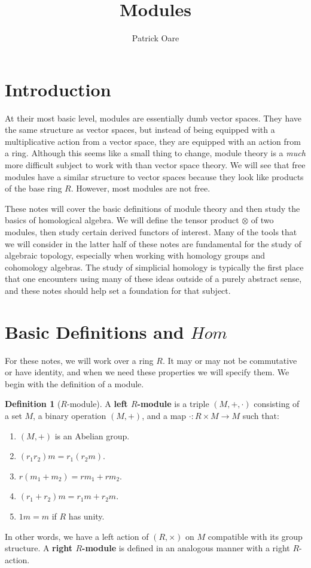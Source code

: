 \documentclass[11pt, oneside]{amsart}   	%
\title{Modules}
\author{Patrick Oare}
\theoremstyle{definition}
\newtheorem{definition}{Definition}[section]
\begin{document}
\maketitle

\section{Introduction}

At their most basic level, modules are essentially dumb vector spaces. They have the same structure as vector spaces, but 
instead of being equipped with a multiplicative action from a vector space, they are equipped with an action from a ring. 
Although this seems like a small thing to change, module theory is a \textit{much} more difficult subject to work with than vector 
space theory. We will see that free modules have a similar structure to vector spaces because they look like products of the 
base ring $R$. However, most modules are not free. 

These notes will cover the basic definitions of module theory and then study the basics of homological algebra. We will define 
the tensor product $\otimes$ of two modules, then study certain derived functors of interest. Many of the tools that we will 
consider in the latter half of these notes are fundamental for the study of algebraic topology, especially when working with 
homology groups and cohomology algebras. The study of simplicial homology is typically the first place that one encounters 
using many of these ideas outside of a purely abstract sense, and these notes should help set a foundation for that subject. 

\section{Basic Definitions and $Hom$}

For these notes, we will work over a ring $R$. It may or may not be commutative or have identity, and when we need these 
properties we will specify them. We begin with the definition of a module. 

\begin{definition}[$R$-module]
	A \textbf{left $R$-module} is a triple $(M, +, \cdot)$ consisting of a set $M$, a binary operation $(M, +)$, and a map 
	$\cdot : R\times M\rightarrow M$ such that:
	\begin{enumerate}
			\item $(M, +)$ is an Abelian group.
			\item $(r_1r_2)m = r_1(r_2 m)$.
			\item $r(m_1 + m_2) = rm_1 + rm_2$.
			\item$ (r_1 + r_2)m = r_1m + r_2m$.
			\item $1m = m$ if $R$ has unity.
	\end{enumerate}
	In other words, we have a left action of $(R, \times)$ on $M$ compatible with its group structure. A 
	\textbf{right $R$-module} is defined in an analogous manner with a right $R$-action. 
\end{definition}
\end{document}
